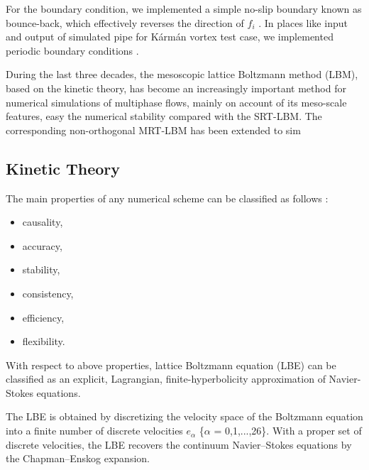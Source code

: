 For the boundary condition, we implemented a simple no-slip boundary known as bounce-back, which effectively reverses the direction of $f_i$ \cite{Mawson2014InteractiveFI}. In places like input and output of simulated pipe for Kármán vortex test case, we implemented periodic boundary conditions \cite{succi2018lattice}.

During the last three decades, the mesoscopic lattice Boltzmann method (LBM), based on the kinetic theory, has become an increasingly important method for numerical simulations of multiphase flows, mainly on account of its meso-scale features, easy the numerical stability compared with the SRT-LBM. The corresponding non-orthogonal MRT-LBM has been extended to sim 


\subsection{Kinetic Theory}

The main properties of any numerical scheme can be classified as follows \citep{succi2001lattice}:

\begin{itemize}
	\item causality,
	\item accuracy,
	\item stability,
	\item consistency,
	\item efficiency,
	\item flexibility. 
\end{itemize}

With respect to above properties, lattice Boltzmann equation (LBE) can be classified as an explicit, Lagrangian, finite-hyperbolicity approximation of Navier-Stokes equations. 


The LBE is obtained by discretizing the velocity space of the Boltzmann equation into a finite number of discrete velocities $e_\alpha$ \{$\alpha$ = 0,1,...,26\}. With a proper set of discrete velocities, the LBE recovers the continuum Navier–Stokes equations by the Chapman–Enskog expansion.


